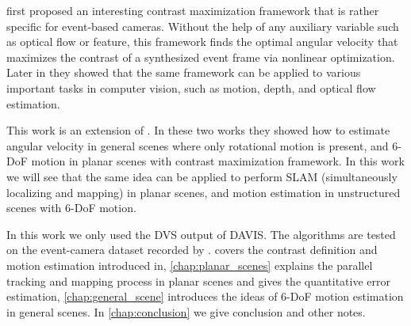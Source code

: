 \citet{gallego2017accurate} first proposed an interesting contrast
maximization framework that is rather specific for event-based
cameras. Without the help of any auxiliary variable such as optical
flow or feature, this framework finds the optimal angular velocity
that maximizes the contrast of a synthesized event frame via nonlinear
optimization. Later in \citep{gallego2018unifying} they showed that
the same framework can be applied to various important tasks in
computer vision, such as motion, depth, and optical flow estimation.

This work is an extension of \citep{gallego2017accurate,
  gallego2018unifying}. In these two works they showed how to estimate
angular velocity in general scenes where only rotational motion is
present, and 6-DoF motion in planar scenes with contrast maximization
framework. In this work we will see that the same idea can be applied
to perform SLAM (simultaneously localizing and mapping) in planar
scenes, and motion estimation in unstructured scenes with 6-DoF
motion.

In this work we only used the DVS output of
DAVIS\citep{brandli2014240}. The algorithms are tested on the
event-camera dataset recorded by
\citet{mueggler2017event}.  covers the contrast
definition and motion estimation introduced
in\citep{gallego2017accurate,gallego2018unifying},
\cref{chap:planar_scenes} explains the parallel tracking and mapping
process in planar scenes and gives the quantitative error estimation,
\cref{chap:general_scene} introduces the ideas of 6-DoF motion
estimation in general scenes. In \cref{chap:conclusion} we give
conclusion and other notes.
